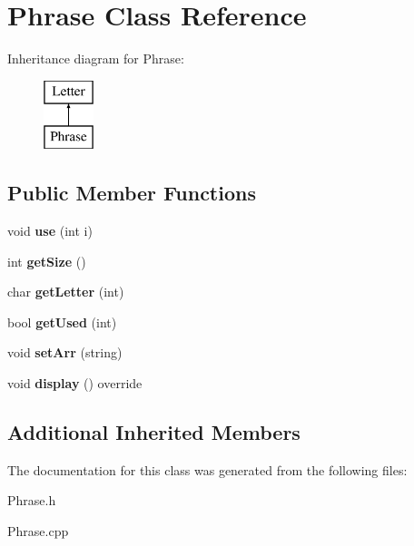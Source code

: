 \hypertarget{class_phrase}{}\section{Phrase Class Reference}
\label{class_phrase}
Inheritance diagram for Phrase\+:\begin{figure}[H]
\begin{center}
\leavevmode
\includegraphics[height=2.000000cm]{class_phrase}
\end{center}
\end{figure}
\subsection*{Public Member Functions}
\begin{DoxyCompactItemize}
\item 
\hypertarget{class_phrase_aad8eb600a46aa1ffc25d7e0cb832f39b}{}\label{class_phrase_aad8eb600a46aa1ffc25d7e0cb832f39b} 
void {\bfseries use} (int i)
\item 
\hypertarget{class_phrase_a8144c049dc65c586127262d367545c20}{}\label{class_phrase_a8144c049dc65c586127262d367545c20} 
int {\bfseries get\+Size} ()
\item 
\hypertarget{class_phrase_a37e468274bd22c24e4cd1b76da578a72}{}\label{class_phrase_a37e468274bd22c24e4cd1b76da578a72} 
char {\bfseries get\+Letter} (int)
\item 
\hypertarget{class_phrase_a6144cc3eeb1f836b17e3d5f27d8eeec4}{}\label{class_phrase_a6144cc3eeb1f836b17e3d5f27d8eeec4} 
bool {\bfseries get\+Used} (int)
\item 
\hypertarget{class_phrase_a660f3b6f3f32a6d2a4316fad7e7bd79c}{}\label{class_phrase_a660f3b6f3f32a6d2a4316fad7e7bd79c} 
void {\bfseries set\+Arr} (string)
\item 
\hypertarget{class_phrase_a5913994bf6d88d27010ea27c7ed5a9ff}{}\label{class_phrase_a5913994bf6d88d27010ea27c7ed5a9ff} 
void {\bfseries display} () override
\end{DoxyCompactItemize}
\subsection*{Additional Inherited Members}


The documentation for this class was generated from the following files\+:\begin{DoxyCompactItemize}
\item 
Phrase.\+h\item 
Phrase.\+cpp\end{DoxyCompactItemize}
